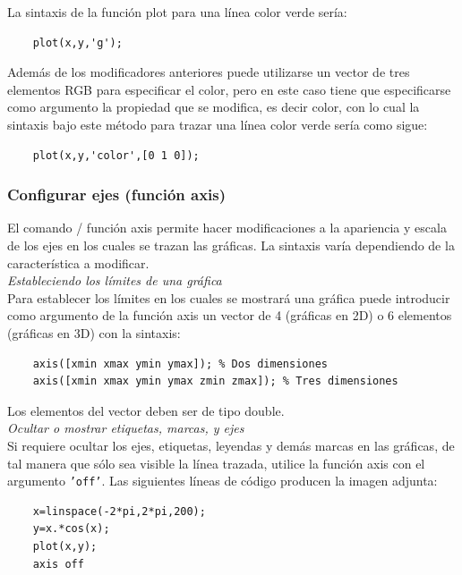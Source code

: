 La sintaxis de la función plot para una línea color verde sería:

\begin{verbatim}
	plot(x,y,'g');
\end{verbatim}

Además de los modificadores anteriores puede utilizarse un vector de tres elementos 
RGB para especificar el color, pero en este caso tiene que especificarse como argumento 
la propiedad que se modifica, es decir color, con lo cual la sintaxis bajo este método 
para trazar una línea color verde sería como sigue:

\begin{verbatim}
	plot(x,y,'color',[0 1 0]);
\end{verbatim}

\subsubsection{Configurar ejes (función axis)}

El comando / función axis permite hacer modificaciones a la apariencia y escala de los 
ejes en los cuales se trazan las gráficas. La sintaxis varía dependiendo de la 
característica a modificar.\\

\textit{Estableciendo los límites de una gráfica}\\

Para establecer los límites en los cuales se mostrará una gráfica puede introducir 
como argumento de la función axis un vector de 4 (gráficas en 2D) o 6 elementos 
(gráficas en 3D) con la sintaxis:

\begin{verbatim}
	axis([xmin xmax ymin ymax]); % Dos dimensiones
	axis([xmin xmax ymin ymax zmin zmax]); % Tres dimensiones
\end{verbatim}

Los elementos del vector deben ser de tipo double.\\

\textit{Ocultar o mostrar etiquetas, marcas, y ejes}\\

Si requiere ocultar los ejes, etiquetas, leyendas y demás marcas en las gráficas, de tal 
manera que sólo sea visible la línea trazada, utilice la función axis con el argumento 
\texttt{'off'}. Las siguientes líneas de código producen la imagen adjunta:

\begin{verbatim}
	x=linspace(-2*pi,2*pi,200);
	y=x.*cos(x);
	plot(x,y);
	axis off
\end{verbatim}

